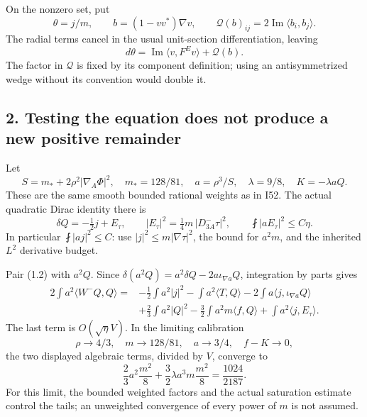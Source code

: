 \documentclass[
  10pt,
]{article}
\begin{document}
On the nonzero set, put \[
 \theta=j/m,\qquad b=(1-vv^*)\nabla v,\qquad
 \mathcal Q(b)_{ij}=2\operatorname{Im}\langle b_i,b_j\rangle .
\] The radial terms cancel in the usual unit-section differentiation,
leaving \[
 d\theta=\operatorname{Im}\langle v,F^Ev\rangle+\mathcal Q(b).
                                                               \tag{1.3}
\] The factor in \(\mathcal Q\) is fixed by its component definition;
using an antisymmetrized wedge without its convention would double it.

\hypertarget{testing-the-equation-does-not-produce-a-new-positive-remainder}{%
\subsection{2. Testing the equation does not produce a new positive
remainder}\label{testing-the-equation-does-not-produce-a-new-positive-remainder}}

Let \[
 S=m_*+2\rho^2|\nabla_A\Phi|^2,\quad
 m_*=128/81,\quad a=\rho^3/S,\quad \lambda=9/8,\quad K=-\lambda aQ.
\] These are the same smooth bounded rational weights as in I52. The
actual quadratic Dirac identity there is \[
 \delta Q=-\tfrac12 j+E_\tau,\qquad
 |E_\tau|^2=\tfrac14m\,|D^-_{3A}\tau|^2,\qquad
 \fint|aE_\tau|^2\le C\eta.
\] In particular \(\fint|aj|^2\le C\): use \(|j|^2\le m|\nabla\tau|^2\),
the bound for \(a^2m\), and the inherited \(L^2\) derivative budget.

Pair (1.2) with \(a^2Q\). Since
\(\delta(a^2Q)=a^2\delta Q-2a\iota_{\nabla a}Q\), integration by parts
gives \[
\begin{aligned}
 2\int a^2\langle W^-Q,Q\rangle={}&
 -\tfrac12\int a^2|j|^2-\int a^2\langle T,Q\rangle
 -2\int a\langle j,\iota_{\nabla a}Q\rangle\\
 &+\tfrac23\int a^2|Q|^2-\tfrac32\int a^2m\langle f,Q\rangle
 +\int a^2\langle j,E_\tau\rangle .
\end{aligned}                                         \tag{2.1}
\] The last term is \(O(\sqrt\eta V)\). In the limiting calibration \[
 \rho\to4/3,\quad m\to128/81,\quad a\to3/4,\quad f-K\to0,
\] the two displayed algebraic terms, divided by \(V\), converge to \[
 \frac23a^2\frac{m^2}{8}
       +\frac32\lambda a^3m\frac{m^2}{8}
       =\frac{1024}{2187}.                            \tag{2.2}
\] For this limit, the bounded weighted factors and the actual
saturation estimate control the tails; an unweighted convergence of
every power of \(m\) is not assumed.
\end{document}
